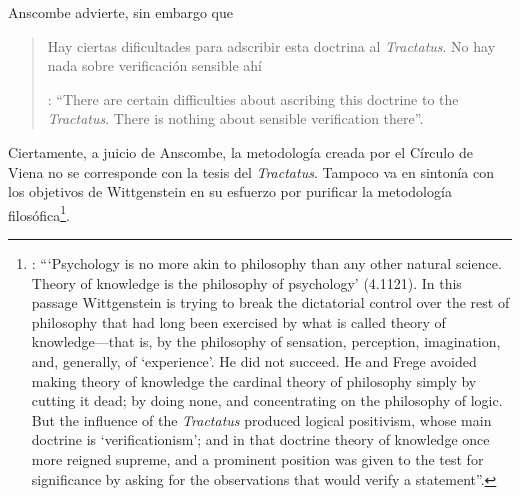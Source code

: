 Anscombe advierte, sin embargo que \blockquote[{\Cite[150]{anscombe1959iwt}}: \enquote{There are certain difficulties about ascribing this doctrine to the \emph{Tractatus}. There is nothing about sensible verification there}.]{Hay ciertas dificultades para adscribir esta doctrina al \emph{Tractatus}. No hay nada sobre verificación sensible ahí}. Ciertamente, a juicio de Anscombe, la metodología creada por el Círculo de Viena no se corresponde con la tesis del \emph{Tractatus}. Tampoco va en sintonía con los objetivos de Wittgenstein en su esfuerzo por purificar la metodología filosófica\footnote{\cite[Cf.][152]{anscombe1959iwt}: \enquote{`Psychology is no more akin to philosophy than any other natural science. Theory of knowledge is the philosophy of psychology' (4.1121). In this passage Wittgenstein is trying to break the dictatorial control over the rest of philosophy that had long been exercised by what is called theory of knowledge---that is, by the philosophy of sensation, perception, imagination, and, generally, of `experience'. He did not succeed. He and Frege avoided making theory of knowledge the cardinal theory of philosophy simply by cutting it dead; by doing none, and concentrating on the philosophy of logic. But the influence of the \emph{Tractatus} produced logical positivism, whose main doctrine is `verificationism'; and in that doctrine theory of knowledge once more reigned supreme, and a prominent position was given to the test for significance by asking for the observations that would verify a statement}.}.

